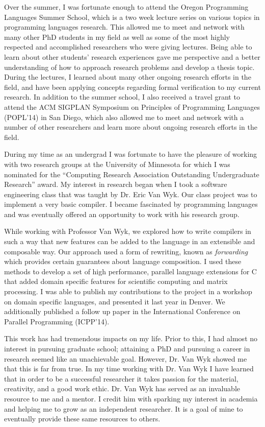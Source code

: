 \documentclass[12pt]{article}
\begin{document}
Over the summer, I was fortunate enough to attend the Oregon Programming Languages Summer School, which is a two week lecture series on various topics in programming languages research.  This allowed me to meet and network with many other PhD students in my field as well as some of the most highly respected and accomplished researchers who were giving lectures.  Being able to learn about other students' research experiences gave me perspective and a better understanding of how to approach research problems and develop a thesis topic.  During the lectures, I learned about many other ongoing research efforts in the field, and have been applying concepts regarding formal verification to my current research. In addition to the summer school, I also received a travel grant to attend the ACM SIGPLAN Symposium on Principles of Programming Languages (POPL'14) in San Diego, which also allowed me to meet and network with a number of other researchers and learn more about ongoing research efforts in the field.  

During my time as an undergrad I was fortunate to have the pleasure of working with two research groups at the University of Minnesota for which I was nominated for the ``Computing Research Association Outstanding Undergraduate Research'' award. My interest in research began when I took a software engineering class that was taught by Dr. Eric Van Wyk. Our class project was to implement a very basic compiler. I became fascinated by programming languages and was eventually offered an opportunity to work with his research group.

While working with Professor Van Wyk, we explored how to write compilers in such a way that new features can be added to the language in an extensible and composable way. Our approach used a form of rewriting, known as \emph{forwarding} which provides certain guarantees about language composition.  I used these methods to develop a set of high performance, parallel language extensions for C that added domain specific features for scientific computing and matrix processing. I was able to publish my contributions to the project in a workshop on domain specific languages, and presented it last year in Denver.  We additionally published a follow up paper in the International Conference on Parallel Programming (ICPP'14).  

This work has had tremendous impacts on my life. Prior to this, I had almost no interest in pursuing graduate school; attaining a PhD and pursuing a career in research seemed like an unachievable goal. However, Dr. Van Wyk showed me that this is far from true. In my time working with Dr. Van Wyk I have learned that in order to be a successful researcher it takes passion for the material, creativity, and a good work ethic. Dr. Van Wyk has served as an invaluable resource to me and a mentor. I credit him with sparking my interest in academia and helping me to grow as an independent researcher. It is a goal of mine to eventually provide these same resources to others.
\end{document}
